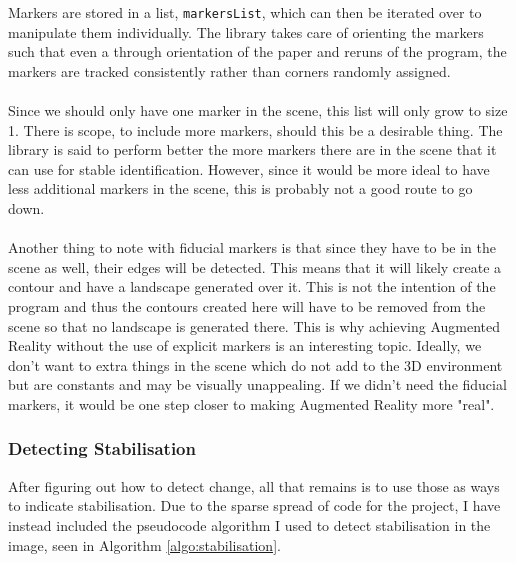 \documentclass[11pt]{article}
\begin{document}
Markers are stored in a list, \texttt{markersList}, which can then be 
iterated over to manipulate them individually. The library takes care
of orienting the markers such that even a through orientation of the
paper and reruns of the program, the markers are tracked consistently 
rather than corners randomly assigned.\\
\\
Since we should only have one marker in the scene, this list will 
only grow to size 1. There is scope, to include more markers,
should this be a desirable thing. The library is said to perform
better the more markers there are in the scene that it can use for
stable identification. However, since it would be more ideal to have 
less additional markers in the scene, this is probably not a good route
to go down.\\
\\
Another thing to note with fiducial markers is that since they have to be
in the scene as well, their edges will be detected. This means that it
will likely create a contour and have a landscape generated over it. This is
not the intention of the program and thus the contours created here will
have to be removed from the scene so that no landscape is generated there.
This is why achieving Augmented Reality without the use of explicit 
markers is an interesting topic. Ideally, we don't want to extra things 
in the scene which do not add to the 3D environment but are constants and
may be visually unappealing. If we didn't need the fiducial markers, it would
be one step closer to making Augmented Reality more "real".

\subsubsection{Detecting Stabilisation}
After figuring out how to detect change, all that remains is to use those
as ways to indicate stabilisation. Due to the sparse spread of code
for the project, I have instead included the pseudocode algorithm I 
used to detect stabilisation in the image, seen in 
Algorithm \ref{algo:stabilisation}. 
\end{document}
